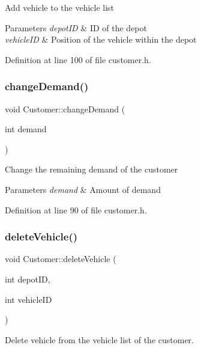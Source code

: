 Add vehicle to the vehicle list 
\begin{DoxyParams}{Parameters}
{\em depot\+ID} & ID of the depot \\
\hline
{\em vehicle\+ID} & Position of the vehicle within the depot \\
\hline
\end{DoxyParams}


Definition at line 100 of file customer.\+h.

\mbox{\label{class_customer_a2c3f4f6dcfdb9445493385b2cdca524e}} 
\subsubsection{\texorpdfstring{change\+Demand()}{changeDemand()}}
{\footnotesize\ttfamily void Customer\+::change\+Demand (\begin{DoxyParamCaption}\item[{int}]{demand }\end{DoxyParamCaption})\hspace{0.3cm}{\ttfamily [inline]}}

Change the remaining demand of the customer 
\begin{DoxyParams}{Parameters}
{\em demand} & Amount of demand \\
\hline
\end{DoxyParams}


Definition at line 90 of file customer.\+h.

\mbox{\label{class_customer_ac4d2860ec8491a4ae65f467d9c52ca27}} 
\subsubsection{\texorpdfstring{delete\+Vehicle()}{deleteVehicle()}}
{\footnotesize\ttfamily void Customer\+::delete\+Vehicle (\begin{DoxyParamCaption}\item[{int}]{depot\+ID,  }\item[{int}]{vehicle\+ID }\end{DoxyParamCaption})}



Delete vehicle from the vehicle list of the customer. 


